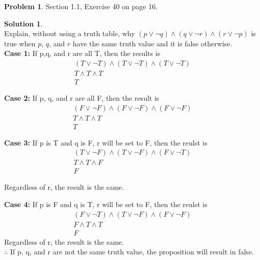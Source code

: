 \documentclass{article}
\theoremstyle{definition}
\newtheorem{problem}{Problem}
\newtheorem*{solution}{Solution}
\begin{document}
\begin{problem} Section 1.1, Exercise 40 on page 16.
\end{problem}
\begin{solution} \ \\
\noindent Explain, without using a truth table, why $(p \lor \neg q) \land
(q \lor \neg r) \land (r \lor \neg p)$ is true when $p$, $q$, and $r$ have the
same truth value and it is false otherwise. \\

\noindent\textbf{Case 1: }If p,q, and r are all T, then the results is 
\begin{equation*}
\begin{gathered}
  (T \lor \neg T) \land (T \lor \neg T) \land (T \lor \neg T) \\
  T \land T \land T\\
  T
\end{gathered}
\end{equation*}

\noindent\textbf{Case 2: }If p, q, and r are all F, then the result is
\begin{equation*}
\begin{gathered}
  (F \lor \neg F) \land (F \lor \neg F) \land (F \lor \neg F) \\
  T \land T \land T\\
  T
\end{gathered}
\end{equation*}

\noindent\textbf{Case 3: }If p is T and q is F, r will be set to F, then the reulst is
\begin{equation*}
\begin{gathered}
(T \lor \neg F) \land (T \lor \neg F) \land (F \lor \neg T) \\
T \land T \land F\\
F
\end{gathered}
\end{equation*}

Regardless of r, the result is the same.

\noindent\textbf{Case 4: }If p is F and q is T, r will be set to F, then the reulst is
\begin{equation*}
\begin{gathered}
(F \lor \neg T) \land (T \lor \neg F) \land (F \lor \neg F) \\
F \land T \land T\\
F
\end{gathered}
\end{equation*}
\noindent Regardless of r, the result is the same. \\
\noindent$\therefore$ If p, q, and r are not the same truth value, the proposition will result in false.  
\end{solution}
\end{document}

